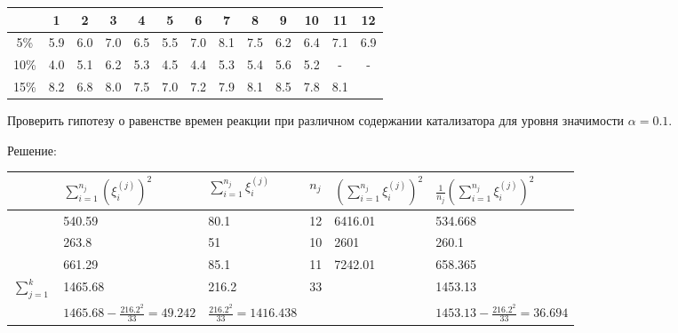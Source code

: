 \documentclass[a4paper,12pt]{article}
\newif\ifsolutions
\begin{document}
\begin{tabular}{|c|c|c|c|c|c|c|c|c|c|c|c|c|}
    \hline
         & 1   & 2   & 3   & 4   & 5   & 6   & 7   & 8   & 9   & 10  & 11  & 12  \\
    \hline
    5\%  & 5.9 & 6.0 & 7.0 & 6.5 & 5.5 & 7.0 & 8.1 & 7.5 & 6.2 & 6.4 & 7.1 & 6.9 \\
    \hline
    10\% & 4.0 & 5.1 & 6.2 & 5.3 & 4.5 & 4.4 & 5.3 & 5.4 & 5.6 & 5.2 & -   & -   \\
    \hline
    15\% & 8.2 & 6.8 & 8.0 & 7.5 & 7.0 & 7.2 & 7.9 & 8.1 & 8.5 & 7.8 & 8.1 &     \\
    \hline
\end{tabular}

Проверить гипотезу о равенстве времен реакции при различном содержании катализатора для уровня значимости $\alpha = 0.1$.

\ifsolutions
    Решение:

    \begin{tabular}{|P{1cm}||P{3.6cm}|P{2cm}|P{0.5cm}|P{2.5cm}|P{3.6cm}|}
        \hline
                       & $\sum_{i=1}^{n_j} \left( \xi_i^{(j)} \right)^2$ & $\sum_{i=1}^{n_j} \xi_i^{(j)}$  & $n_j$ & $\left( \sum_{i=1}^{n_j} \xi_i^{(j)} \right)^2$ & $\frac{1}{n_j} \left( \sum_{i=1}^{n_j} \xi_i^{(j)} \right)^2$ \\
        \hline
                       & 540.59                                          & 80.1                            & 12    & 6416.01                                         & 534.668                                                       \\
        \hline
                       & 263.8                                           & 51                              & 10    & 2601                                            & 260.1                                                         \\
        \hline
                       & 661.29                                          & 85.1                            & 11    & 7242.01                                         & 658.365                                                       \\
        \hline
        \hline
        $\sum_{j=1}^k$ & 1465.68                                         & 216.2                           & 33    &                                                 & 1453.13                                                       \\
        \hline
                       & $1465.68 - \frac{216.2^2}{33} = 49.242$         & $\frac{216.2^2}{33} = 1416.438$ &       &                                                 & $1453.13 - \frac{216.2^2}{33} = 36.694$                       \\
        \hline
    \end{tabular}
\end{document}
